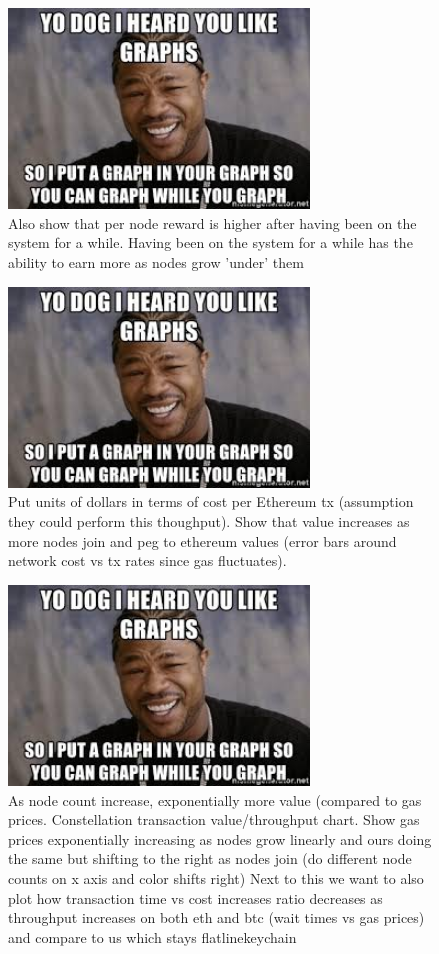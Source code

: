 \documentclass{article}
\begin{document}
\begin{figure}[h]
\caption{Also show that per node reward is higher after having been on the system for a while. Having been on the system for a while has the ability to earn more as nodes grow 'under' them  }
\includegraphics[width=8cm]{yo_dawg}
\centering
\end{figure}


\begin{figure}[h]
\caption{Put units of dollars in terms of cost per Ethereum tx (assumption they could perform this thoughput). Show that value increases as more nodes join and peg to ethereum values (error bars around network cost vs tx rates since gas fluctuates). }
\includegraphics[width=8cm]{yo_dawg}
\centering
\end{figure}

\begin{figure}[h]
\caption{As node count increase, exponentially more value (compared to gas prices. Constellation transaction value/throughput chart. Show gas prices exponentially increasing as nodes grow linearly and ours doing the same but shifting to the right as nodes join (do different node counts on x axis and color shifts right) Next to this we want to also plot how transaction time vs cost increases ratio decreases as throughput increases on both eth and btc (wait times vs gas prices) and compare to us which stays flatlinekeychain}
\includegraphics[width=8cm]{yo_dawg}
\centering
\end{figure}
\end{document}
